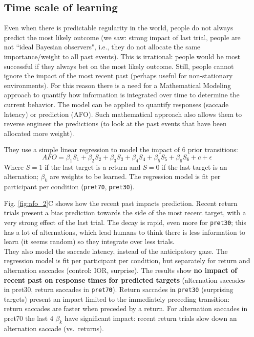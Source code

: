 \subsection{Time scale of learning}
Even when there is predictable regularity in the world, people do not always predict the most likely outcome (we saw: strong impact of last trial, people are not ``ideal Bayesian observers", i.e., they do not allocate the same importance/weight to all past events). This is irrational: people would be most successful if they always bet on the most likely outcome. Still, people cannot ignore the impact of the most recent past (perhaps useful for non-stationary environments). For this reason there is a need for a Mathematical Modeling approach to quantify how information is integrated over time to determine the current behavior. The model can be applied to quantify responses (saccade latency) or prediction (AFO). Such mathematical approach also allows them to reverse engineer the predictions (to look at the past events that have been allocated more weight).

They use a simple linear regression to model the impact of 6 prior transitions:
\[
AFO = \beta_1S_1 + \beta_2S_2 + \beta_3S_3 + \beta_4S_4+ \beta_5S_5+ \beta_6S_6 + c + \epsilon
\]
Where $S=1$ if the last target is a return and $S=0$ if the last target is an alternation; $\beta_k$ are weights to be learned.  The regression model is fit per participant per condition (\texttt{pret70}, \texttt{pret30}).

Fig. \ref{fig:afo_2}C shows how the recent past impacts prediction. Recent return trials present a bias prediction towards the side of the most recent target, with a very strong effect of the last trial. The decay is rapid, even more for \texttt{pret30}; this has a lot of alternations, which lead humans to think there is less information to learn (it seems random) so they integrate over less trials.\\

They also model the saccade latency, instead of the anticipatory gaze. The regression model is fit per participant per condition, but separately for return and alternation saccades (control: IOR, surprise). The results show \textbf{no impact of recent past on response times for predicted targets} (alternation saccades in pret30, return saccades in \texttt{pret70}). Return saccades in \texttt{pret30} (surprising targets) present an impact limited to the immediately preceding transition: return saccades are faster when preceded by a return. For alternation saccades in pret70 the last 4 $\beta_k$ have significant impact: recent return trials slow down an alternation saccade (vs.~returns).\\


